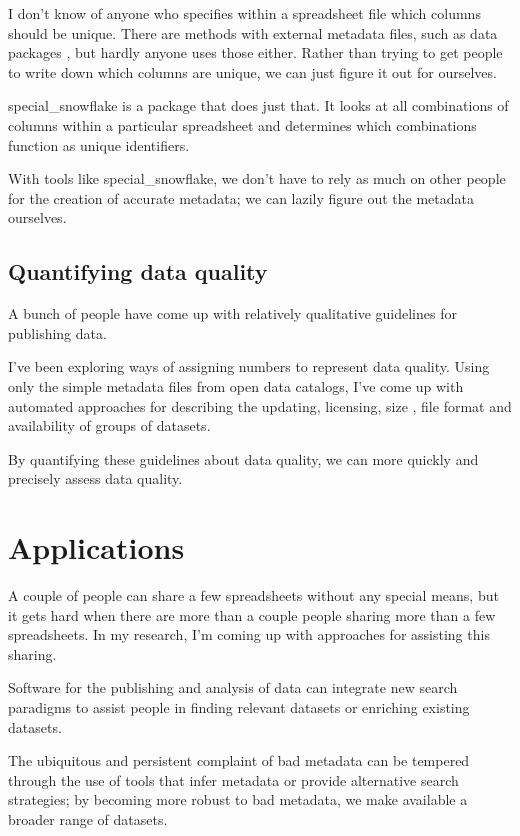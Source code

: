 \documentclass{acm_proc_article-sp}
\begin{document}
I don't know of anyone who specifies within a spreadsheet file which columns
should be unique. There are methods with external metadata files, such as data
packages \cite{datapackages}, but hardly anyone uses those either. Rather than
trying to get people to write down which columns are unique, we can just figure
it out for ourselves.

special\_snowflake \cite{specialsnowflake} is a package that does just that.
It looks at all combinations of columns within a particular spreadsheet and
determines which combinations function as unique identifiers.

With tools like special\_snowflake, we don't have to rely as much on other
people for the creation of accurate metadata; we can lazily figure out the
metadata ourselves.

\subsection{Quantifying data quality}
A bunch of people \cite{open-data-census,fivestars,sunlight,sebastopol,odi}
have come up with relatively qualitative guidelines for publishing data.

I've been exploring ways of assigning numbers to represent data quality.
Using only the simple metadata files from open data catalogs, I've come up
with automated approaches for describing the updating, \cite{updatedness}
licensing, \cite{licensing} size \cite{summary}, file format \cite{file-formats}
and availability \cite{dead,zombie} of groups of datasets.

By quantifying these guidelines about data quality, we can more quickly and
precisely assess data quality.

\section{Applications}
A couple of people can share a few spreadsheets without any special means,
but it gets hard when there are more than a couple people sharing more than
a few spreadsheets. In my research, I'm coming up with approaches for assisting
this sharing.

Software for the publishing and analysis of data can integrate new search
paradigms to assist people in finding relevant datasets or enriching existing
datasets.

The ubiquitous and persistent complaint of bad metadata can be tempered through
the use of tools that infer metadata or provide alternative search strategies;
by becoming more robust to bad metadata, we make available a broader range of
datasets.
\end{document}
